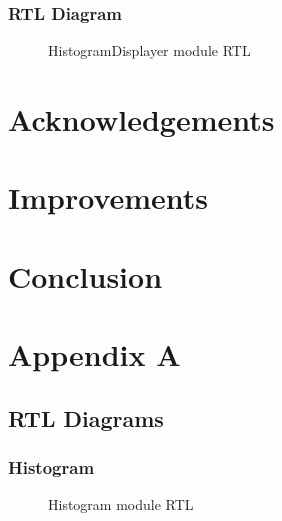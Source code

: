 \documentclass[12pt]{article}
\begin{document}
  \subsubsection{RTL Diagram}
    \begin{figure}[H]
    \caption{HistogramDisplayer module RTL}
    \label{fig:histogram_displayer_rtl}
  \end{figure}
  
  \section{Acknowledgements}
  
  \section{Improvements}
  
  \section{Conclusion}
  
  \newpage
  \section{Appendix A}
  \subsection{RTL Diagrams}
  \subsubsection{Histogram}
  \begin{figure}[H]
    \ContinuedFloat
    \caption{Histogram module RTL}
    \label{fig:histogram_rtl}
  \end{figure}
  
  
  
  
\end{document}
